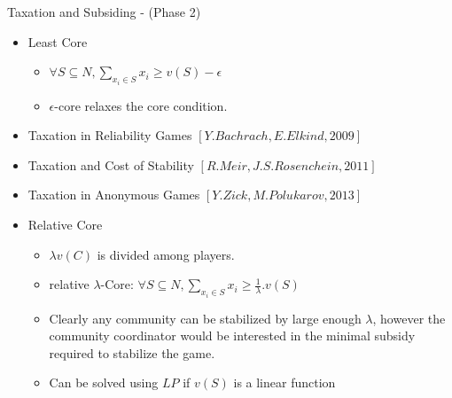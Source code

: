 \documentclass{beamer}
\begin{document}
\begin{frame}{Taxation and Subsiding - (Phase 2)}
    \begin{itemize}
        \item Least Core
        \begin{itemize}
            \item $\forall S \subseteq N, \sum_{x_i \in S} x_i \geq v(S) - \epsilon$
            \item $\epsilon$-core relaxes the core condition.
        \end{itemize}
        \item Taxation in Reliability Games \small $[Y. Bachrach, E. Elkind, 2009]$

        \item Taxation and Cost of Stability \small $[R. Meir, J. S. Rosenchein, 2011]$

        \item Taxation in Anonymous Games \small $[Y. Zick, M. Polukarov, 2013]$

        \item Relative Core
        \begin{itemize}
            \item $\lambda v(C)$ is divided among players.
            \item relative $\lambda$-Core: $\forall S \subseteq N, \sum_{x_i \in S} x_i \geq \frac{1}{\lambda}.v(S)$
            \item Clearly any community can be stabilized by large enough $\lambda$, however the community coordinator would be interested in the minimal subsidy required to stabilize the game.
            \item Can be solved using $LP$ if $v(S)$ is a linear function
        \end{itemize}
    \end{itemize}
\end{frame}
\end{document}
